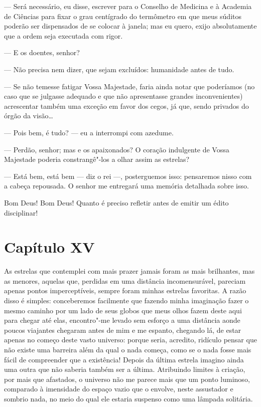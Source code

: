 --- Será necessário, eu disse, escrever para o Conselho de Medicina e à
Academia de Ciências para fixar o grau centígrado do termômetro em que
meus súditos poderão ser dispensados de se colocar à janela; mas eu
quero, exijo absolutamente que a ordem seja executada com rigor. 

--- E os doentes, senhor?

--- Não precisa nem dizer, que sejam excluídos: humanidade antes de
tudo. 

--- Se não temesse fatigar Vossa Majestade, faria ainda notar que
poderíamos (no caso que se julgasse adequado e que não apresentasse
grandes inconvenientes) acrescentar também uma exceção em favor dos
cegos, já que, sendo privados do órgão da visão\ldots

--- Pois bem, é tudo? --- eu a interrompi com azedume.

--- Perdão, senhor; mas e os apaixonados? O coração indulgente de Vossa
Majestade poderia constrangê"-los a olhar assim as estrelas? 

--- Está bem, está bem --- diz o rei ---, posterguemos isso: pensaremos nisso
com a cabeça repousada. O senhor me entregará uma memória detalhada sobre
isso.

Bom Deus! Bom Deus! Quanto é preciso refletir antes de emitir um édito
disciplinar!

\section*{Capítulo XV}

 As estrelas que contemplei com mais prazer jamais foram as mais
brilhantes, mas as menores, aquelas que, perdidas em uma distância
incomensurável, pareciam apenas pontos imperceptíveis, sempre foram
minhas estrelas favoritas. A razão disso é simples: conceberemos
facilmente que fazendo minha imaginação fazer o mesmo caminho por um
lado de seus globos que meus olhos fazem deste aqui para chegar até
elas, encontro"-me levado sem esforço a uma distância aonde poucos
viajantes chegaram antes de mim e me espanto, chegando lá, de estar
apenas no começo deste vasto universo: porque seria, acredito, ridículo
pensar que não existe uma barreira além da qual o nada começa, como se
o nada fosse mais fácil de compreender que a existência! Depois da
última estrela imagino ainda uma outra que não saberia também ser a
última. Atribuindo limites à criação, por mais que afastados, o
universo não me parece mais que um ponto luminoso, comparado à
imensidade do espaço vazio que o envolve, neste assustador e sombrio
nada, no meio do qual ele estaria suspenso como uma lâmpada solitária.

